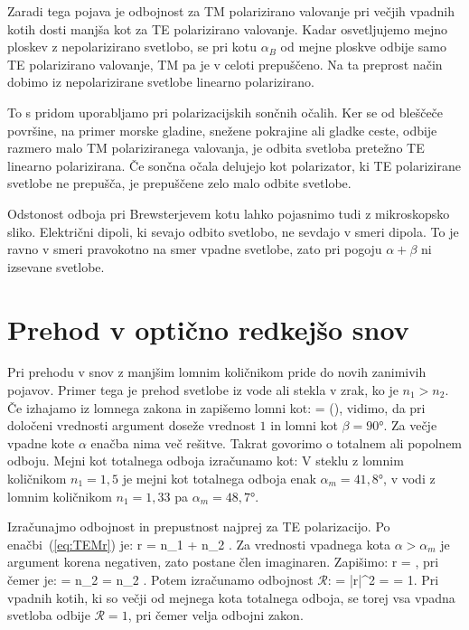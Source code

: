 Zaradi tega pojava je odbojnost za TM polarizirano valovanje pri
večjih vpadnih kotih dosti manjša kot za TE polarizirano valovanje. 
Kadar osvetljujemo mejno ploskev z nepolarizirano svetlobo, se 
pri kotu $\alpha_B$ od mejne ploskve odbije samo TE polarizirano
valovanje, TM pa je v celoti prepuščeno. Na ta preprost način
dobimo iz nepolarizirane svetlobe linearno polarizirano. 

To s pridom uporabljamo pri polarizacijskih sončnih očalih. Ker
se od bleščeče površine, na primer morske gladine, snežene pokrajine
ali gladke ceste, odbije razmero malo TM polariziranega valovanja, 
je odbita svetloba pretežno TE linearno polarizirana. Če sončna
očala delujejo kot polarizator, ki TE polarizirane svetlobe
ne prepušča, je prepuščene zelo malo odbite svetlobe.

\begin{remark}
Odstonost odboja pri Brewsterjevem kotu lahko pojasnimo tudi z mikroskopsko
sliko. Električni dipoli, ki sevajo odbito svetlobo, ne sevdajo v smeri
dipola. To je ravno v smeri pravokotno na smer vpadne svetlobe, zato 
pri pogoju $\alpha + \beta$ ni izsevane svetlobe.
\end{remark}

\section{Prehod v optično redkejšo snov}
Pri prehodu v snov z manjšim lomnim količnikom pride do novih zanimivih pojavov.
Primer tega je prehod svetlobe iz vode ali stekla v zrak, ko je $n_1>n_2$.
Če izhajamo iz lomnega zakona in zapišemo lomni kot:
\beq
\beta = \arcsin \left(\sin \alpha\right),
\label{eq:04_52}
\eeq
vidimo, da pri določeni vrednosti argument doseže vrednost $1$ in lomni kot
$\beta = 90\si{\degree}$. Za večje
vpadne kote $\alpha$ enačba nima več rešitve. Takrat govorimo o totalnem 
ali popolnem odboju. Mejni kot totalnega odboja izračunamo kot:
V steklu z lomnim količnikom $n_1=1,5$ je mejni kot totalnega odboja
enak $\alpha_m = 41,8\si{\degree}$, v vodi z lomnim količnikom 
$n_1 = 1,33$ pa $\alpha_m = 48,7\si{\degree}$.

Izračunajmo odbojnost in prepustnost najprej za TE polarizacijo.
Po enačbi~(\ref{eq:TEMr}) je:
\beq
r = 
{n_1 \cos \alpha + n_2 }.
\eeq
Za vrednosti vpadnega kota $\alpha > \alpha_m$ je argument korena
negativen, zato postane člen imaginaren. Zapišimo:
\beq
r = ,
\eeq
pri čemer je:
\beq
\kappa = n_2   = 
n_2 .
\eeq
Potem izračunamo odbojnost $\mathcal{R}$:
\beq
{} = |r|^2 = 
\cdot {} = 1.
\eeq
Pri vpadnih kotih, ki so večji od mejnega kota totalnega odboja, se torej 
vsa vpadna svetloba odbije $\mathcal{R} = 1$, pri čemer velja
odbojni zakon. 

